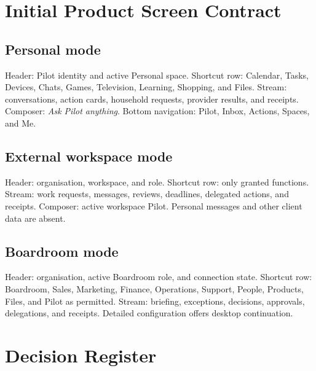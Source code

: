 \documentclass[11pt,a4paper]{article}
\begin{document}
\appendix
\section{Initial Product Screen Contract}

\subsection{Personal mode}

Header: Pilot identity and active Personal space.  Shortcut row: Calendar,
Tasks, Devices, Chats, Games, Television, Learning, Shopping, and Files.
Stream: conversations, action cards, household requests, provider results, and
receipts.  Composer: \emph{Ask Pilot anything}.  Bottom navigation: Pilot,
Inbox, Actions, Spaces, and Me.

\subsection{External workspace mode}

Header: organisation, workspace, and role.  Shortcut row: only granted
functions.  Stream: work requests, messages, reviews, deadlines, delegated
actions, and receipts.  Composer: active workspace Pilot.  Personal messages
and other client data are absent.

\subsection{Boardroom mode}

Header: organisation, active Boardroom role, and connection state.  Shortcut
row: Boardroom, Sales, Marketing, Finance, Operations, Support, People,
Products, Files, and Pilot as permitted.  Stream: briefing, exceptions,
decisions, approvals, delegations, and receipts.  Detailed configuration offers
desktop continuation.

\section{Decision Register}
\end{document}
